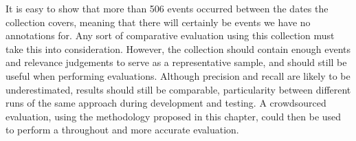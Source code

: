 It is easy to show that more than 506 events occurred between the dates the collection covers, meaning that there will certainly be events we have no annotations for.
Any sort of comparative evaluation using this collection must take this into consideration.
However, the collection should contain enough events and relevance judgements to serve as a representative sample, and should still be useful when performing evaluations.
Although precision and recall are likely to be underestimated, results should still be comparable, particularity between different runs of the same approach during development and testing.
A crowdsourced evaluation, using the methodology proposed in this chapter, could then be used to perform a throughout and more accurate evaluation.

